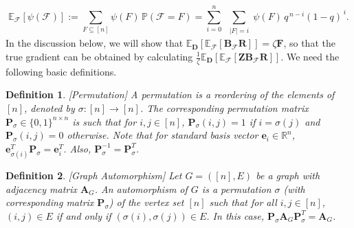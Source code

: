 \documentclass[journal,draftcls,onecolumn]{IEEEtran}
\theoremstyle{mystyle}
\newtheorem{defn}{Definition}
\newcommand{\bfD}{\mathbf{D}}
\newcommand{\bfA}{\mathbf{A}}
\newcommand{\bfP}{\mathbf{P}}
\newcommand{\cF}{\mathcal{F}}
\begin{document}


\[
\mathbb{E}_{\mathcal{F}}[\psi(\mathcal{F})]
:= \sum_{F \subseteq [n]} \psi(F)\, \mathbb{P}(\mathcal{F} = F)
= \sum_{i = 0}^n \ \sum_{\substack{|F| = i}}
\psi(F)\, q^{\,n-i}(1-q)^{\,i}.
\]
In the discussion below, we will show that $\mathbb{E}_{\mathbf{D}}[\mathbb{E}_{\mathcal{F}}[\mathbf{B}_{\cF} \mathbf{R}]]= \zeta \mathbf{F}$, so that the true gradient can be obtained by calculating $\frac{1}{\zeta}\mathbb{E}_{\mathbf{D}}[\mathbb{E}_{\mathcal{F}}[\mathbf{Z}\mathbf{B}_{\cF}\mathbf{R}]]$. We need the following basic definitions.
\begin{defn}{[{\it Permutation}]}
A permutation is a reordering of the elements of $[n]$, denoted by $\sigma : [n] \to [n]$.  
The corresponding permutation matrix
$\bfP_{\sigma} \in \{0,1\}^{n \times n}$ is such that for $i, j \in [n]$, $\bfP_{\sigma}(i,j) = 1$ if $i = \sigma(j)$ and $\bfP_{\sigma}(i,j) = 0$ otherwise. Note that for standard basis vector $\mathbf{e}_i \in \mathbb{R}^n$,  $ \mathbf{e}_{\sigma(i)}^T\bfP_{\sigma} = \mathbf{e}_i ^T$. Also, $\bfP_{\sigma}^{-1} = \bfP_{\sigma}^T$.      
\end{defn}
    









\begin{defn}{[{\it Graph Automorphism}]}
Let $G=([n], E)$ be a graph with adjacency matrix $\bfA_G$. An automorphism of $G$ is a permutation $\sigma$ (with corresponding matrix $\bfP_{\sigma}$) of the vertex set $[n]$ such that for all $i, j \in [n]$, $(i,j) \in E$ if and only if $(\sigma(i),\sigma(j)) \in E$. In this case, $\bfP_{\sigma} \bfA_G \bfP_{\sigma}^T = \bfA_G$. %
\end{defn}
\end{document}

